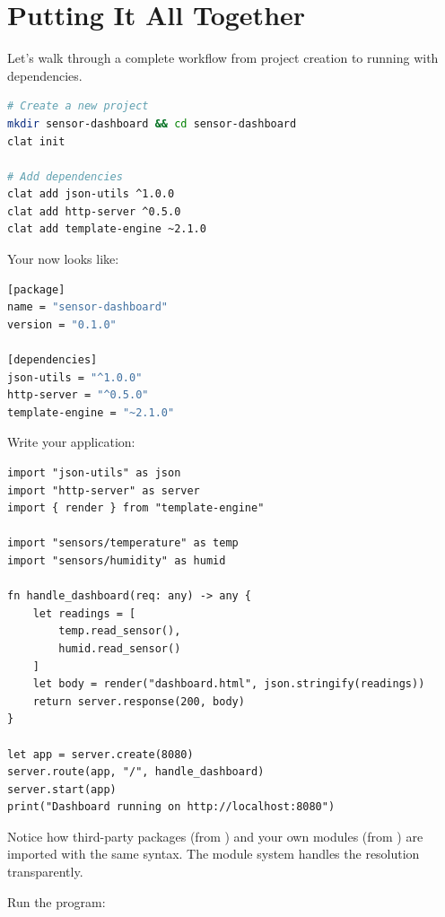 \section{Putting It All Together}\label{sec:package-workflow}

Let's walk through a complete workflow from project creation to running with dependencies.

\begin{lstlisting}[language=bash, numbers=none, caption={Complete project workflow}]
# Create a new project
mkdir sensor-dashboard && cd sensor-dashboard
clat init

# Add dependencies
clat add json-utils ^1.0.0
clat add http-server ^0.5.0
clat add template-engine ~2.1.0
\end{lstlisting}

Your  now looks like:

\begin{lstlisting}[language=bash, numbers=none]
[package]
name = "sensor-dashboard"
version = "0.1.0"

[dependencies]
json-utils = "^1.0.0"
http-server = "^0.5.0"
template-engine = "~2.1.0"
\end{lstlisting}

Write your application:

\begin{lstlisting}[language=Lattice, caption={main.lat --- using installed packages}]
import "json-utils" as json
import "http-server" as server
import { render } from "template-engine"

import "sensors/temperature" as temp
import "sensors/humidity" as humid

fn handle_dashboard(req: any) -> any {
    let readings = [
        temp.read_sensor(),
        humid.read_sensor()
    ]
    let body = render("dashboard.html", json.stringify(readings))
    return server.response(200, body)
}

let app = server.create(8080)
server.route(app, "/", handle_dashboard)
server.start(app)
print("Dashboard running on http://localhost:8080")
\end{lstlisting}

Notice how third-party packages (from ) and your own modules (from ) are imported with the same syntax.
The module system handles the resolution transparently.

Run the program:

